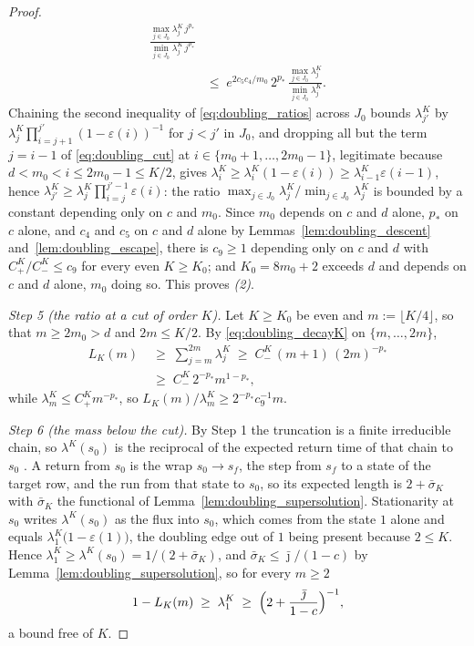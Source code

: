 \begin{proof}
\begin{equation}
\begin{aligned}
    \frac{\max_{j\in J_0}\lambda^K_j\,j^{p_*}}{\min_{j\in J_0}\lambda^K_j\,j^{p_*}}\\
    \;&\leq\;e^{2c_5c_4/m_0}\,2^{p_*}\,
    \frac{\max_{j\in J_0}\lambda^K_j}{\min_{j\in J_0}\lambda^K_j} .
\end{aligned}
\end{equation}
Chaining the second inequality of \eqref{eq:doubling_ratios} across $J_0$ bounds
$\lambda^K_{j'}$ by $\lambda^K_j\prod_{i=j+1}^{j'}(1-\varepsilon(i))^{-1}$ for $j<j'$ in $J_0$,
and dropping all but the term $j=i-1$ of \eqref{eq:doubling_cut} at
$i\in\{m_0+1,\dots,2m_0-1\}$, legitimate because $d<m_0<i\leq2m_0-1\leq K/2$, gives
$\lambda^K_i\geq\lambda^K_i(1-\varepsilon(i))\geq\lambda^K_{i-1}\varepsilon(i-1)$, hence
$\lambda^K_{j'}\geq\lambda^K_j\prod_{i=j}^{j'-1}\varepsilon(i)$: the ratio
$\max_{j\in J_0}\lambda^K_j/\min_{j\in J_0}\lambda^K_j$ is bounded by a constant depending only
on $c$ and $m_0$. Since $m_0$ depends on $c$ and $d$ alone, $p_*$ on $c$ alone, and $c_4$ and
$c_5$ on $c$ and $d$ alone by Lemmas~\ref{lem:doubling_descent}
and~\ref{lem:doubling_escape}, there is $c_9\geq1$ depending only on $c$ and $d$ with
$C^K_+/C^K_-\leq c_9$ for every even $K\geq K_0$; and $K_0=8m_0+2$ exceeds $d$ and depends on
$c$ and $d$ alone, $m_0$ doing so. This proves \emph{(2)}.

\emph{Step 5 (the ratio at a cut of order $K$).} Let $K\geq K_0$ be even and
$m:=\lfloor K/4\rfloor$, so that $m\geq2m_0>d$ and $2m\leq K/2$. By \eqref{eq:doubling_decayK}
on $\{m,\dots,2m\}$,
\begin{equation}
\begin{aligned}
    L_K(m)\;&\geq\;\sum_{j=m}^{2m}\lambda^K_j\;\geq\;C^K_-\,(m+1)\,(2m)^{-p_*}\\
    &\geq\;C^K_-\,2^{-p_*}m^{1-p_*},
\end{aligned}
\end{equation}
while $\lambda^K_m\leq C^K_+m^{-p_*}$, so $L_K(m)/\lambda^K_m\geq2^{-p_*}c_9^{-1}m$.

\emph{Step 6 (the mass below the cut).} By Step 1 the truncation is a finite irreducible
chain, so $\lambda^K(s_0)$ is the reciprocal of the expected return time of that chain to
$s_0$ \citep{levin2017markov}. A return from $s_0$ is the wrap $s_0\rightarrow s_f$, the step
from $s_f$ to a state of the target row, and the run from that state to $s_0$, so its expected
length is $2+\bar\sigma_K$ with $\bar\sigma_K$ the functional of
Lemma~\ref{lem:doubling_supersolution}. Stationarity at $s_0$ writes $\lambda^K(s_0)$ as the
flux into $s_0$, which comes from the state $1$ alone and equals
$\lambda^K_1\bigl(1-\varepsilon(1)\bigr)$, the doubling edge out of $1$ being present because
$2\leq K$. Hence $\lambda^K_1\geq\lambda^K(s_0)=1/(2+\bar\sigma_K)$, and
$\bar\sigma_K\leq\bar\jmath/(1-c)$ by Lemma~\ref{lem:doubling_supersolution}, so for every
$m\geq2$
\begin{equation}
    1-L_K(m)\;\geq\;\lambda^K_1\;\geq\;\Bigl(2+\frac{\bar\jmath}{1-c}\Bigr)^{-1},
\end{equation}
a bound free of $K$.


\end{proof}
